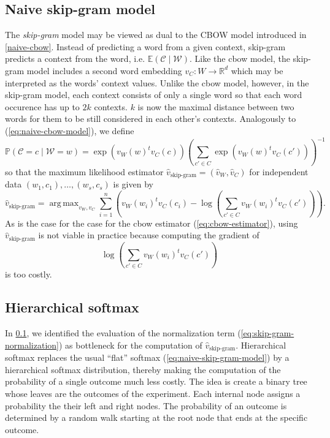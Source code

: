 \documentclass{amsart}
\theoremstyle{plain}
\theoremstyle{definition}
\newcommand{\R}{\mathbb{R}}
\renewcommand{\P}{\mathbb{P}}
\newcommand{\E}{\mathbb{E}}
\DeclareMathOperator*{\argmax}{arg\,max}
\begin{document}
\subsection{Naive skip-gram model}
\label{naive-skip-gram}
The \emph{skip-gram} model may be viewed as dual to the CBOW model introduced in \ref{naive-cbow}.
Instead of predicting a word from a given context, skip-gram predicts a context from the word, i.e. $\E(\mathcal{C} \mid \mathcal{W})$.
Like the cbow model, the skip-gram model includes a second word embedding $v_C : W \rightarrow \R^d$ which may be interpreted as the words' context values.
Unlike the cbow model, however, in the skip-gram model, each context consists of only a single word so that each word occurence has up to $2 k$ contexts.
$k$ is now the maximal distance between two words for them to be still considered in each other's contexts.
Analogously to (\ref{eq:naive-cbow-model}), we define
\begin{equation}
  \label{eq:naive-skip-gram-model}
  \P(\mathcal{C} = c \mid \mathcal{W} = w) = \exp(v_W(w)^t v_C(c)) \left( \sum_{c' \in C} \exp(v_W(w)^t v_C(c')) \right)^{-1}
\end{equation}
so that the maximum likelihood estimator $\hat v_{\text{skip-gram}} = (\hat v_W, \hat v_C)$ for independent data $(w_1, c_1), \dots, (w_s, c_s)$ is given by
\begin{equation}
  \hat v_{\text{skip-gram}} = \argmax_{v_W, v_C} \sum_{i = 1}^n \left( v_W(w_i)^t v_C(c_i) - \log \left( \sum_{c' \in C} v_W(w_i)^t v_C(c') \right) \right).
\end{equation}
As is the case for the case for the cbow estimator (\ref{eq:cbow-estimator}), using $\hat v_{\text{skip-gram}}$ is not viable in practice because computing the gradient of
\begin{equation}
  \label{eq:skip-gram-normalization}
  \log \left( \sum_{c' \in C} v_W(w_i)^t v_C(c') \right)
\end{equation}
is too costly.

\subsection{Hierarchical softmax}
In \ref{naive-skip-gram}, we identified the evaluation of the normalization term (\ref{eq:skip-gram-normalization}) as bottleneck for the computation of $\hat v_{\text{skip-gram}}$.
Hierarchical softmax replaces the usual ``flat'' softmax (\ref{eq:naive-skip-gram-model}) by a hierarchical softmax distribution, thereby making the computation of the probability of a single outcome much less costly.
The idea is create a binary tree whose leaves are the outcomes of the experiment.
Each internal node assigns a probability the their left and right nodes.
The probability of an outcome is determined by a random walk starting at the root node that ends at the specific outcome.
\end{document}
